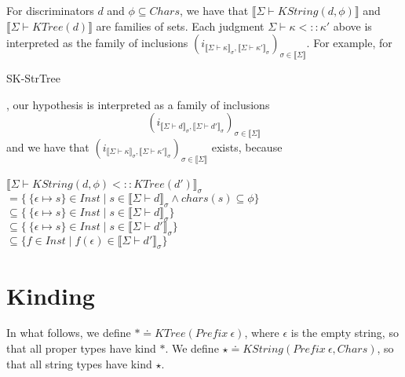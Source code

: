 \documentclass{article}
\newcommand{\sem}[1]{\llbracket #1 \rrbracket}
\begin{document}
For discriminators $d$ and $\phi \subseteq \mathit{Chars}$, we have that $\sem{\Sigma \vdash \mathit{KString}(d,\phi)}$ and $\sem{\Sigma \vdash \mathit{KTree}(d)}$ are families of sets. Each judgment $\Sigma \vdash \kappa <:: \kappa'$ above is interpreted as the family of inclusions $(i_{\sem{\Sigma \vdash \kappa}_\sigma,\sem{\Sigma \vdash \kappa'}_\sigma})_{\sigma \in \sem{\Sigma}}$. For example, for \begin{sc}SK-StrTree\end{sc}, our hypothesis is interpreted as a family of inclusions $$(i_{\sem{\Sigma \vdash d}_{\sigma}, \sem{\Sigma \vdash d'}_\sigma})_{\sigma \in \sem{\Sigma}}$$ and we have that $(i_{\sem{\Sigma \vdash \kappa}_\sigma,\sem{\Sigma \vdash \kappa'}_\sigma})_{\sigma \in \sem{\Sigma}}$ exists, because\\~\\
$\sem{\Sigma \vdash \mathit{KString(d,\phi)} <:: \mathit{KTree}(d')}_\sigma$\\
$= \{~\{ \epsilon \mapsto s \} \in \mathit{Inst} \mid s \in \sem{\Sigma \vdash d}_{\sigma} \wedge \mathit{chars}(s) \subseteq \phi \}$\\
$\subseteq \{~\{ \epsilon \mapsto s \} \in \mathit{Inst} \mid s \in \sem{\Sigma \vdash d}_{\sigma} \}$\\
$\subseteq \{~\{ \epsilon \mapsto s \} \in \mathit{Inst} \mid s \in \sem{\Sigma \vdash d'}_{\sigma} \}$\\
$\subseteq \{ f \in \mathit{Inst} \mid f(\epsilon) \in \sem{\Sigma \vdash d'}_{\sigma} \}$

\section*{Kinding}

In what follows, we define $\ast \doteq \mathit{KTree}(\mathit{Prefix}~\epsilon)$, where $\epsilon$ is the empty string, so that all proper types have kind $\ast$. We define $\star \doteq \mathit{KString}(\mathit{Prefix}~\epsilon, \mathit{Chars})$, so that all string types have kind $\star$.
\end{document}
